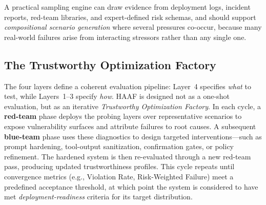 A practical sampling engine can draw evidence from deployment logs, incident reports, red-team libraries, and expert-defined risk schemas, and should support \emph{compositional scenario generation} where several pressures co-occur, because many real-world failures arise from interacting stressors rather than any single one.

\subsection{The Trustworthy Optimization Factory}
\label{subsec:factory}

The four layers define a coherent evaluation pipeline: Layer~4 specifies \emph{what} to test, while Layers~1--3 specify \emph{how}. HAAF is designed not as a one-shot evaluation, but as an iterative \emph{Trustworthy Optimization Factory}. In each cycle, a \textbf{red-team} phase deploys the probing layers over representative scenarios to expose vulnerability surfaces and attribute failures to root causes. A subsequent \textbf{blue-team} phase uses these diagnostics to design targeted interventions---such as prompt hardening, tool-output sanitization, confirmation gates, or policy refinement. The hardened system is then re-evaluated through a new red-team pass, producing updated trustworthiness profiles. This cycle repeats until convergence metrics (e.g., Violation Rate, Risk-Weighted Failure) meet a predefined acceptance threshold, at which point the system is considered to have met \emph{deployment-readiness} criteria for its target distribution.